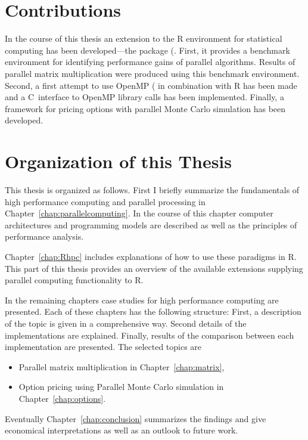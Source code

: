 \section{Contributions}
In the course of this thesis an extension to the R
environment for statistical computing has been developed---the
 package (\cite{theussl07paRc}. First, it provides a
benchmark environment for 
identifying performance gains of parallel algorithms. Results of
parallel matrix multiplication were produced using this benchmark
environment. Second, a first
attempt to use OpenMP (\cite{openMP05} in combination with R has been
made and a 
C~interface to OpenMP library calls has been implemented. Finally,
a framework for pricing options with parallel Monte Carlo simulation
has been developed.
 
\section{Organization of this Thesis}

This thesis is organized as follows. First I briefly summarize the
fundamentals of high performance computing and parallel processing in
Chapter~\ref{chap:parallelcomputing}. In the course of this chapter
computer architectures and programming models are described as well as the
principles of performance analysis.

Chapter~\ref{chap:Rhpc} includes explanations of how to use these
paradigms in R. This part of
this thesis provides an overview of the
available extensions supplying parallel computing functionality to R.

In the remaining chapters case studies for high performance
computing are presented. Each of these chapters has the following
structure: First,
a description of the topic is given in a comprehensive way. Second
details of the implementations are explained. Finally, results of the
comparison between each implementation are presented. The selected
topics are
\begin{itemize}
\item Parallel matrix multiplication in Chapter~\ref{chap:matrix},
\item Option pricing using Parallel Monte Carlo simulation in
  Chapter~\ref{chap:options}. 
\end{itemize}
Eventually Chapter~\ref{chap:conclusion} summarizes
the findings and give economical interpretations as well as an outlook
to future work.
